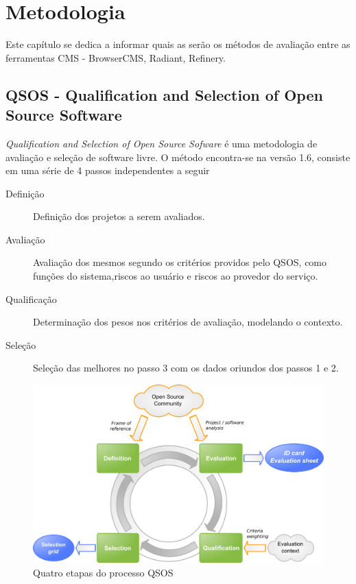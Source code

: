 \chapter{Metodologia}

Este capítulo se dedica a informar quais as serão os métodos de avaliação entre as ferramentas CMS - BrowserCMS, Radiant, Refinery.  

\section{QSOS - Qualification and Selection of Open Source Software}

\emph{Qualification and Selection of Open Source Sofware} é uma metodologia de avaliação e seleção de software livre. O método encontra-se na versão 1.6, consiste em uma série de 4 passos independentes a seguir \cite{qsos_site} 

\begin{description} 
    \item[Definição] Definição dos projetos a serem avaliados.
    \item[Avaliação] Avaliação dos mesmos segundo os critérios providos pelo QSOS, como funções do sistema,riscos ao usuário e riscos ao provedor do serviço.
    \item[Qualificação] Determinação dos pesos nos critérios de avaliação, modelando o contexto.
    \item[Seleção] Seleção das melhores no passo 3 com os dados  oriundos dos passos 1 e 2.
\end{description}

\begin{figure}[here]
\includegraphics[width=150mm]{images/4_steps.png}
\caption{Quatro etapas do processo QSOS}
\label{fig:qsos_steps.png}
\end{figure}

